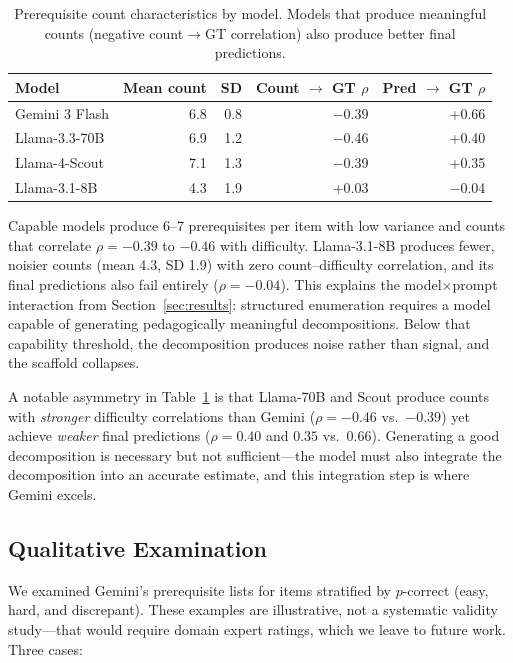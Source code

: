 \begin{table}[t]
\caption{Prerequisite count characteristics by model. Models that produce meaningful counts (negative count$\to$GT correlation) also produce better final predictions.}\label{tab:count-models}
\centering\footnotesize
\begin{tabular}{@{}lrrrr@{}}
\toprule
Model & Mean count & SD & Count $\to$ GT $\rho$ & Pred $\to$ GT $\rho$ \\
\midrule
Gemini 3 Flash  & 6.8 & 0.8 & $-$0.39 & +0.66 \\
Llama-3.3-70B   & 6.9 & 1.2 & $-$0.46 & +0.40 \\
Llama-4-Scout   & 7.1 & 1.3 & $-$0.39 & +0.35 \\
Llama-3.1-8B    & 4.3 & 1.9 & +0.03  & $-$0.04 \\
\bottomrule
\end{tabular}
\end{table}

Capable models produce 6--7 prerequisites per item with low variance and counts that correlate $\rho = -0.39$ to $-0.46$ with difficulty. Llama-3.1-8B produces fewer, noisier counts (mean 4.3, SD 1.9) with zero count--difficulty correlation, and its final predictions also fail entirely ($\rho = -0.04$). This explains the model$\times$prompt interaction from Section~\ref{sec:results}: structured enumeration requires a model capable of generating pedagogically meaningful decompositions. Below that capability threshold, the decomposition produces noise rather than signal, and the scaffold collapses.

A notable asymmetry in Table~\ref{tab:count-models} is that Llama-70B and Scout produce counts with \emph{stronger} difficulty correlations than Gemini ($\rho = -0.46$ vs.\ $-0.39$) yet achieve \emph{weaker} final predictions ($\rho = 0.40$ and $0.35$ vs.\ $0.66$). Generating a good decomposition is necessary but not sufficient---the model must also integrate the decomposition into an accurate estimate, and this integration step is where Gemini excels.

\subsection{Qualitative Examination}\label{sec:qualitative}

We examined Gemini's prerequisite lists for items stratified by $p$-correct (easy, hard, and discrepant). These examples are illustrative, not a systematic validity study---that would require domain expert ratings, which we leave to future work. Three cases:

